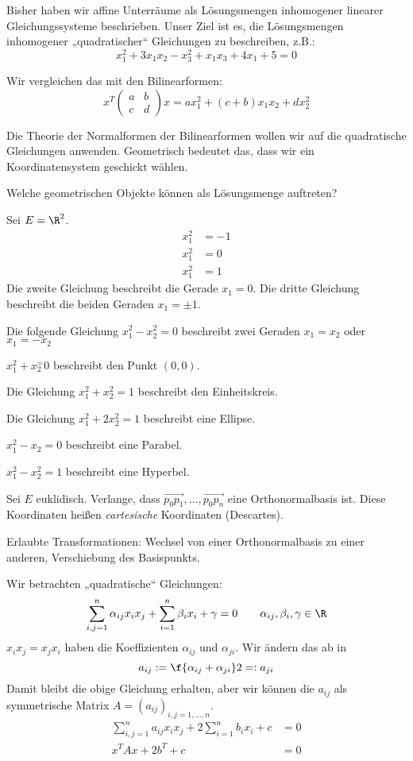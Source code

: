 \documentclass{mycourse}
\begin{document}
Bisher haben wir affine Unterräume als Lösungsmengen inhomogener linearer Gleichungssysteme beschrieben.
Unser Ziel ist es, die Lösungsmengen inhomogener „quadratischer“ Gleichungen zu beschreiben, z.B.:
\[
	x_1^2 + 3x_1x_2 - x_3^2 + x_1x_3 + 4x_1 + 5 = 0
\]

Wir vergleichen das mit den Bilinearformen:
\[
	x^T \begin{pmatrix}a&b\\c&d\end{pmatrix}x = ax_1^2 + (c+b)x_1x_2 + dx_2^2
\]

Die Theorie der Normalformen der Bilinearformen wollen wir auf die quadratische Gleichungen anwenden.
Geometrisch bedeutet das, dass wir ein Koordinatensystem geschickt wählen.

Welche geometrischen Objekte können als Lösungsmenge auftreten?

\begin{ex}
	Sei $E=\R^2$.
	\begin{align*}
		x_1^2 &= -1\\
		x_1^2 &= 0\\
		x_1^2 &= 1
	\end{align*}
	Die zweite Gleichung beschreibt die Gerade $x_1=0$.
	Die dritte Gleichung beschreibt die beiden Geraden $x_1=\pm 1$.
	
	Die folgende Gleichung $x_1^2 - x_2^2 = 0$ beschreibt zwei Geraden $x_1=x_2$ oder $x_1 = -x_2$

	$x_1^2+x_2^=0$ beschreibt den Punkt $(0,0)$.
	
	Die Gleichung
	$
		x_1^2 + x_2^2 = 1
	$
	beschreibt den Einheitskreis.

	Die Gleichung
	$
		x_1^2 + 2x_2^2 = 1
	$
	beschreibt eine Ellipse.
	
	$x_1^2 - x_2 = 0$ beschreibt eine Parabel.

	$x_1^2 - x_2^2 = 1$ beschreibt eine Hyperbel.
\end{ex}

Sei $E$ euklidisch.
Verlange, dass $\vec{p_0p_1}, \dotsc, \vec{p_0p_n}$ eine Orthonormalbasis ist.
Diese Koordinaten heißen \emph{cartesische} Koordinaten (Descartes).

Erlaubte Transformationen: Wechsel von einer Orthonormalbasis zu einer anderen, Verschiebung des Basispunkts.

Wir betrachten „quadratische“ Gleichungen:
\[
	\sum_{i,j=1}^n \alpha_{ij}x_ix_j + \sum_{i=1}^n \beta_ix_i + \gamma = 0 \qquad \alpha_{ij},\beta_i, \gamma \in \R
\]
$x_ix_j = x_jx_i$ haben die Koeffizienten $\alpha_{ij}$ und $\alpha_{ji}$.
Wir ändern das ab in
\[
	a_{ij} := \f{\alpha_{ij} + \alpha_{ji}}2 =: a_{ji}
\]
Damit bleibt die obige Gleichung erhalten, aber wir können die $a_{ij}$ als symmetrische Matrix $A=(a_{ij})_{i,j=1,\dotsc,n}$.
\begin{align*}
	\sum_{i,j=1}^n a_{ij}x_ix_j + 2 \sum_{i=1}^n b_i x_i + c &= 0\\
	x^TAx + 2b^T + c &= 0
\end{align*}
\end{document}
